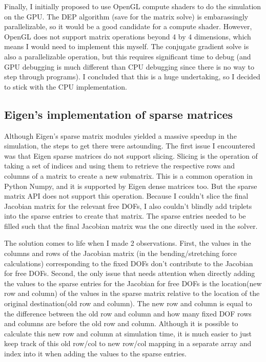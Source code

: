 \documentclass[letterpaper, 10 pt, conference]{ieeeconf}  %
\begin{document}
        Finally, I initially proposed to use OpenGL compute shaders to do the simulation on the GPU. The DEP algorithm (save for the matrix solve) is embarassingly parallelizable, so it would be a good candidate for a compute shader. However, OpenGL does not support matrix operations beyond 4 by 4 dimensions, which means I would need to implement this myself. The conjugate gradient solve is also a parallelizable operation, but this requires significant time to debug (and GPU debugging is much different than CPU debugging since there is no way to step through programs). I concluded that this is a huge undertaking, so I decided to stick with the CPU implementation.

\subsection{Eigen's implementation of sparse matrices}
        Although Eigen's sparse matrix modules yielded a massive speedup in the simulation, the steps to get there were astounding. The first issue I encountered was that Eigen sparse matrices do not support slicing. Slicing is the operation of taking a set of indices and using them to retrieve the respective rows and columns of a matrix to create a new submatrix. This is a common operation in Python Numpy, and it is supported by Eigen dense matrices too. But the sparse matrix API does not support this operation. Because I couldn't slice the final Jacobian matrix for the relevant free DOFs, I also couldn't blindly add triplets into the sparse entries to create that matrix. The sparse entries needed to be filled such that the final Jacobian matrix was the one directly used in the solver. 

        The solution comes to life when I made 2 observations. First, the values in the columns and rows of the Jacobian matrix (in the bending/stretching force calculations) corresponding to the fixed DOFs don't contribute to the Jacobian for free DOFs. Second, the only issue that needs attention when directly adding the values to the sparse entries for the Jacobian for free DOFs is the location(new row and column) of the values in the sparse matrix relative to the location of the original destination(old row and column). The new row and column is equal to the difference between the old row and column and how many fixed DOF rows and columns are before the old row and column. Although it is possible to calculate this new row and column at simulation time, it is much easier to just keep track of this old row/col to new row/col mapping in a separate array and index into it when adding the values to the sparse entries. 
        
\end{document}
